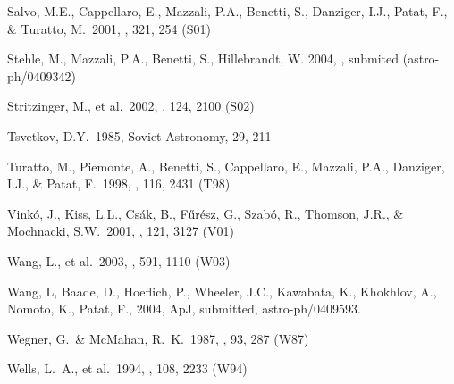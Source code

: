 \documentclass[preprint2]{aastex}
\begin{document}
\begin{thebibliography}{}
 Salvo, M.E., Cappellaro, E., 
Mazzali, P.A., Benetti, S., Danziger, I.J., Patat, F., \& Turatto, M.\ 
2001, \mnras, 321, 254 (S01)

 Stehle, M., Mazzali, P.A., Benetti, S.,
Hillebrandt, W. 2004, \mnras, submited (astro-ph/0409342)

 Stritzinger, M., et al.\ 2002, 
\aj, 124, 2100 (S02)

 Tsvetkov, D.Y.\ 1985, Soviet 
Astronomy, 29, 211 


 Turatto, M., Piemonte, A., 
Benetti, S., Cappellaro, E., Mazzali, P.A., Danziger, I.J., \& Patat, F.\ 
1998, \aj, 116, 2431 (T98)

 Vink{\' o}, J., 
Kiss, L.L., Cs{\' a}k, B., F{\H u}r{\' e}sz, G., Szab{\' o}, R., Thomson, 
J.R., \& Mochnacki, S.W.\ 2001, \aj, 121, 3127 (V01)

 Wang, L., et al.\ 2003, 
\apj, 591, 1110 (W03)

 Wang, L, Baade, D., Hoeflich, P., Wheeler, J.C., Kawabata, K., Khokhlov, A.,
Nomoto, K., Patat, F., 2004, ApJ, submitted, astro-ph/0409593.

 Wegner, G.~\& 
McMahan, R.~K.\ 1987, \aj, 93, 287 (W87)

 Wells, L.~A., et al.\ 
1994, \aj, 108, 2233 (W94)

\end{thebibliography}
\end{document}
